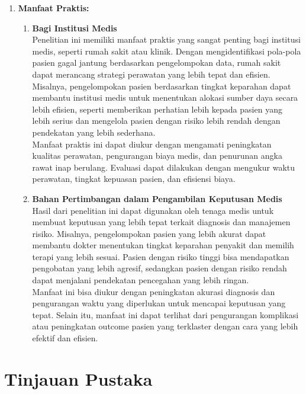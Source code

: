 \documentclass[english,12pt,a4paper,openany]{book}
\begin{document}
\begin{enumerate}
		\item \textbf{Manfaat Praktis:}
		\begin{enumerate}
			\item \textbf{Bagi Institusi Medis}\\
			Penelitian ini memiliki manfaat praktis yang sangat penting bagi institusi medis, seperti rumah sakit atau klinik. Dengan mengidentifikasi pola-pola pasien gagal jantung berdasarkan pengelompokan data, rumah sakit dapat merancang strategi perawatan yang lebih tepat dan efisien. Misalnya, pengelompokan pasien berdasarkan tingkat keparahan dapat membantu institusi medis untuk menentukan alokasi sumber daya secara lebih efisien, seperti memberikan perhatian lebih kepada pasien yang lebih serius dan mengelola pasien dengan risiko lebih rendah dengan pendekatan yang lebih sederhana.\\
			
			Manfaat praktis ini dapat diukur dengan mengamati peningkatan kualitas perawatan, pengurangan biaya medis, dan penurunan angka rawat inap berulang. Evaluasi dapat dilakukan dengan mengukur waktu perawatan, tingkat kepuasan pasien, dan efisiensi biaya.\\
			
			\item \textbf{Bahan Pertimbangan dalam Pengambilan Keputusan Medis}\\
			Hasil dari penelitian ini dapat digunakan oleh tenaga medis untuk membuat keputusan yang lebih tepat terkait diagnosis dan manajemen risiko. Misalnya, pengelompokan pasien yang lebih akurat dapat membantu dokter menentukan tingkat keparahan penyakit dan memilih terapi yang lebih sesuai. Pasien dengan risiko tinggi bisa mendapatkan pengobatan yang lebih agresif, sedangkan pasien dengan risiko rendah dapat menjalani pendekatan pencegahan yang lebih ringan.\\
			
			Manfaat ini bisa diukur dengan peningkatan akurasi diagnosis dan pengurangan waktu yang diperlukan untuk mencapai keputusan yang tepat. Selain itu, manfaat ini dapat terlihat dari pengurangan komplikasi atau peningkatan outcome pasien yang terklaster dengan cara yang lebih efektif dan efisien.
		\end{enumerate}
	\end{enumerate}
	
	\chapter{Tinjauan Pustaka}
	
\end{document}
